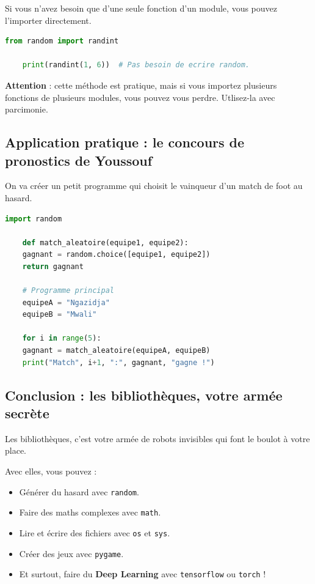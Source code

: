 \documentclass[12pt,a4paper]{article}
\begin{document}
Si vous n'avez besoin que d'une seule fonction d'un module, vous pouvez l'importer directement.

\begin{lstlisting}[language=Python]
	from random import randint
	
	print(randint(1, 6))  # Pas besoin de ecrire random.
\end{lstlisting}

\textbf{Attention} : cette méthode est pratique, mais si vous importez plusieurs fonctions de plusieurs modules, vous pouvez vous perdre. Utlisez-la avec parcimonie.

\subsection{Application pratique : le concours de pronostics de Youssouf}

On va créer un petit programme qui choisit le vainqueur d'un match de foot au hasard.

\begin{lstlisting}[language=Python]
	import random
	
	def match_aleatoire(equipe1, equipe2):
	gagnant = random.choice([equipe1, equipe2])
	return gagnant
	
	# Programme principal
	equipeA = "Ngazidja"
	equipeB = "Mwali"
	
	for i in range(5):
	gagnant = match_aleatoire(equipeA, equipeB)
	print("Match", i+1, ":", gagnant, "gagne !")
\end{lstlisting}

\subsection{Conclusion : les bibliothèques, votre armée secrète}

Les bibliothèques, c'est votre armée de robots invisibles qui font le boulot à votre place.

Avec elles, vous pouvez :

\begin{itemize}
	\item [\ding{172}] Générer du hasard avec \texttt{random}.
	\item [\ding{173}] Faire des maths complexes avec \texttt{math}.
	\item [\ding{174}] Lire et écrire des fichiers avec \texttt{os} et \texttt{sys}.
	\item [\ding{175}] Créer des jeux avec \texttt{pygame}.
	\item [\ding{176}] Et surtout, faire du \textbf{Deep Learning} avec \texttt{tensorflow} ou \texttt{torch} !
\end{itemize}
\end{document}
